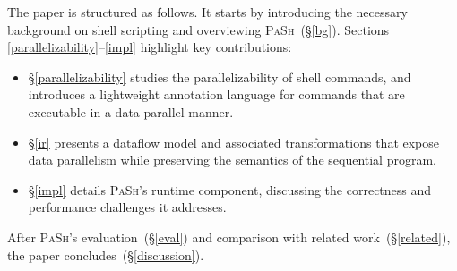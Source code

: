 \documentclass[sigplan, review, screen, anonymous]{acmart}
\newcommand{\nv}[1]{[{\color{cyan}nv: #1}]}
\newcommand{\sx}[1]{(\S\ref{#1})}
\newcommand{\sys}{{\scshape PaSh}\xspace}
\begin{document}
The paper is structured as follows.
It starts by introducing the necessary background on shell scripting and overviewing \sys~\sx{bg}.
Sections \ref{parallelizability}--\ref{impl} highlight key contributions:
\begin{itemize}
  \item
  \S\ref{parallelizability}
    studies the parallelizability of shell commands, and introduces a lightweight annotation language for commands that are executable in a data-parallel manner.

  \item
  \S\ref{ir} presents a dataflow model and associated transformations that expose data parallelism while preserving the semantics of the sequential program.

  \item
  \S\ref{impl} details \sys's runtime component, discussing the correctness and performance challenges it addresses.

\end{itemize}

\noindent
After \sys's evaluation~\sx{eval} and  comparison with related work~\sx{related}, the paper concludes~\sx{discussion}.  



% 
%
\end{document}
